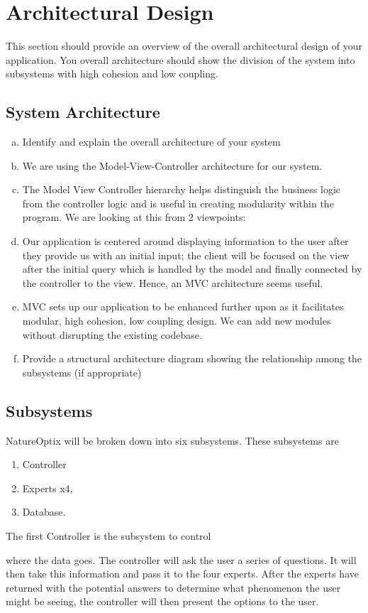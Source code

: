 \documentclass[]{article}
\begin{document}
\section{Architectural Design}
\label{sec:architectural_design}
This section should provide an overview of the overall architectural design of your application. You overall architecture should show the division of the system into subsystems with high cohesion and low coupling.

\subsection{System Architecture}
\label{sub:system_architecture}
\begin{enumerate}[a)]
	\item Identify and explain the overall architecture of your system
	\item We are using the Model-View-Controller architecture for our system.
	\item The Model View Controller hierarchy helps distinguish the business logic from the controller logic and is useful in creating modularity within the program. We are looking at this from 2 viewpoints:
		\item Our application is centered around displaying information to the user after they provide us with an initial input; the client will be focused on the view after the initial query which is handled by the model and finally connected by the controller to the view. Hence, an MVC architecture seems useful.
		\item MVC sets up our application to be enhanced further upon as it facilitates modular, high cohesion, low coupling design. We can add new modules without disrupting the existing codebase.
	\item Provide a structural architecture diagram showing the relationship among the subsystems (if appropriate)
\end{enumerate}

\subsection{Subsystems}
\label{sub:subsystems}
NatureOptix will be broken down into six subsystems. These subsystems are
\begin{enumerate}
	\item Controller %
	\item Experts x4,
	\item Database.
\end{enumerate}
The first Controller is the subsystem to control where the data goes. The controller will ask the user a series of questions. It will then take this information and pass it to the four experts. After the experts have returned with the potential answers to determine what phenomenon the user might be seeing, the controller will then present the options to the user. 
\end{document}
